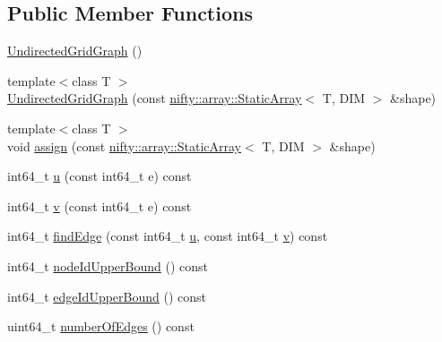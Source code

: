 \subsection*{Public Member Functions}
\begin{DoxyCompactItemize}
\item 
\hyperlink{classnifty_1_1graph_1_1UndirectedGridGraph_3_01DIM_00_01true_01_4_ae07e559f9d33b543c69a6466bbc10348}{Undirected\+Grid\+Graph} ()
\item 
{\footnotesize template$<$class T $>$ }\\\hyperlink{classnifty_1_1graph_1_1UndirectedGridGraph_3_01DIM_00_01true_01_4_a6776a2c7c54036eb5c4df8045c6a7d44}{Undirected\+Grid\+Graph} (const \hyperlink{namespacenifty_1_1array_a683f151f19c851754e0c6d55ed16a0c2}{nifty\+::array\+::\+Static\+Array}$<$ T, D\+I\+M $>$ \&shape)
\item 
{\footnotesize template$<$class T $>$ }\\void \hyperlink{classnifty_1_1graph_1_1UndirectedGridGraph_3_01DIM_00_01true_01_4_ad966a5e524bba56b8096c999d41bfeae}{assign} (const \hyperlink{namespacenifty_1_1array_a683f151f19c851754e0c6d55ed16a0c2}{nifty\+::array\+::\+Static\+Array}$<$ T, D\+I\+M $>$ \&shape)
\item 
int64\+\_\+t \hyperlink{classnifty_1_1graph_1_1UndirectedGridGraph_3_01DIM_00_01true_01_4_ab9fb4ee38640d191bc349a9c10e1bd09}{u} (const int64\+\_\+t e) const 
\item 
int64\+\_\+t \hyperlink{classnifty_1_1graph_1_1UndirectedGridGraph_3_01DIM_00_01true_01_4_a803aedb88e20114b37b34bd246858e63}{v} (const int64\+\_\+t e) const 
\item 
int64\+\_\+t \hyperlink{classnifty_1_1graph_1_1UndirectedGridGraph_3_01DIM_00_01true_01_4_af4a61ee4323c7246f0464dce726b7c58}{find\+Edge} (const int64\+\_\+t \hyperlink{classnifty_1_1graph_1_1UndirectedGridGraph_3_01DIM_00_01true_01_4_ab9fb4ee38640d191bc349a9c10e1bd09}{u}, const int64\+\_\+t \hyperlink{classnifty_1_1graph_1_1UndirectedGridGraph_3_01DIM_00_01true_01_4_a803aedb88e20114b37b34bd246858e63}{v}) const 
\item 
int64\+\_\+t \hyperlink{classnifty_1_1graph_1_1UndirectedGridGraph_3_01DIM_00_01true_01_4_a8c037223cb2e3037a607978435ee1b52}{node\+Id\+Upper\+Bound} () const 
\item 
int64\+\_\+t \hyperlink{classnifty_1_1graph_1_1UndirectedGridGraph_3_01DIM_00_01true_01_4_a8c7941e7700cddaacdba339a8cbd9959}{edge\+Id\+Upper\+Bound} () const 
\item 
uint64\+\_\+t \hyperlink{classnifty_1_1graph_1_1UndirectedGridGraph_3_01DIM_00_01true_01_4_ac5a6c14340918860f72708e82ac51784}{number\+Of\+Edges} () const 

\end{DoxyCompactItemize}
